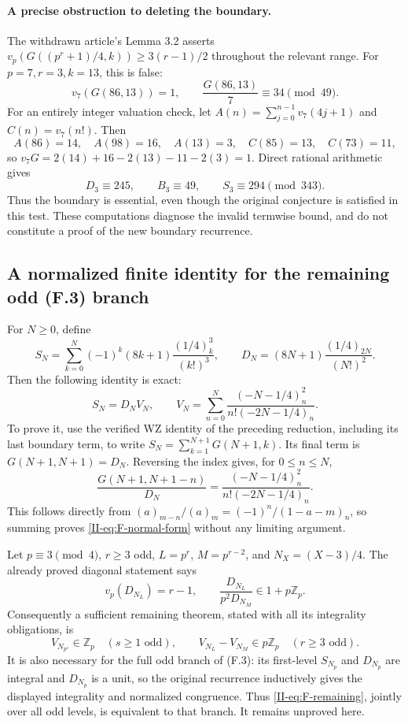 \documentclass[11pt,letterpaper]{article}
\numberwithin{equation}{section}
\begin{document}
\paragraph{A precise obstruction to deleting the boundary.}
The withdrawn article's Lemma 3.2 asserts
$v_p(G((p^r+1)/4,k))\ge3(r-1)/2$ throughout the relevant range.
For $p=7,r=3,k=13$, this is false:
\[
 v_7(G(86,13))=1,
 \qquad \frac{G(86,13)}7\equiv34\pmod{49}.
\]
For an entirely integer valuation check, let
$A(n)=\sum_{j=0}^{n-1}v_7(4j+1)$ and
$C(n)=v_7(n!)$. Then
\[
 A(86)=14,\quad A(98)=16,\quad A(13)=3,\quad
 C(85)=13,\quad C(73)=11,
\]
so $v_7G=2(14)+16-2(13)-11-2(3)=1$.
Direct rational arithmetic gives
\[
 D_3\equiv245,\qquad B_3\equiv49,\qquad S_3\equiv294\pmod{343}.
\]
Thus the boundary is essential, even though the original conjecture is
satisfied in this test. These computations diagnose the invalid termwise
bound, and do not constitute a proof of the new boundary recurrence.

\subsection{A normalized finite identity for the remaining odd (F.3) branch}
For $N\ge0$, define
\[
 S_N=\sum_{k=0}^N(-1)^k(8k+1)\frac{(1/4)_k^3}{(k!)^3},\qquad
 D_N=(8N+1)\frac{(1/4)_{2N}}{(N!)^2}.
\]
Then the following identity is exact:
\begin{equation}\label{II-eq:F-normal-form}
 S_N=D_NV_N,\qquad
 V_N=\sum_{n=0}^N\frac{(-N-1/4)_n^2}{n!(-2N-1/4)_n}.
\end{equation}
To prove it, use the verified WZ identity of the preceding reduction,
including its last boundary term, to write
$S_N=\sum_{k=1}^{N+1}G(N+1,k)$. Its final term is
$G(N+1,N+1)=D_N$. Reversing the index gives, for $0\le n\le N$,
\[
 \frac{G(N+1,N+1-n)}{D_N}
 =\frac{(-N-1/4)_n^2}{n!(-2N-1/4)_n}.
\]
This follows directly from
$(a)_{m-n}/(a)_m=(-1)^n/(1-a-m)_n$, so summing proves
\eqref{II-eq:F-normal-form} without any limiting argument.

Let $p\equiv3\pmod4$, $r\ge3$ odd, $L=p^r$, $M=p^{r-2}$,
and $N_X=(X-3)/4$. The already proved diagonal statement says
\[
 v_p(D_{N_L})=r-1,\qquad
 \frac{D_{N_L}}{p^2D_{N_M}}\in1+p\mathbb Z_p.
\]
Consequently a sufficient remaining theorem, stated with all its
integrality obligations, is
\begin{equation}\label{II-eq:F-remaining}
 V_{N_{p^s}}\in\mathbb Z_p\quad(s\ge1\text{ odd}),\qquad
 V_{N_L}-V_{N_M}\in p\mathbb Z_p\quad(r\ge3\text{ odd}).
\end{equation}
It is also necessary for the full odd branch of (F.3): its first-level
$S_{N_p}$ and $D_{N_p}$ are integral and $D_{N_p}$ is a unit, so the
original recurrence inductively gives the displayed integrality and
normalized congruence. Thus \eqref{II-eq:F-remaining}, jointly over all odd
levels, is equivalent to that branch. It remains unproved here.
\end{document}
